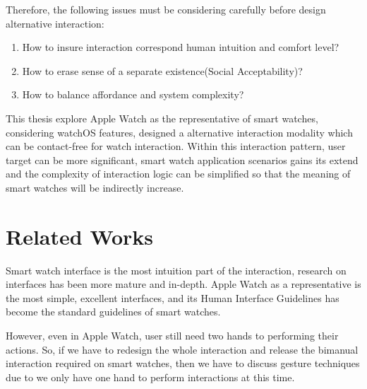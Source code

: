 Therefore, the following issues must be considering carefully before design alternative interaction:

\begin{enumerate}
    \kaishu
    \item How to insure interaction correspond human intuition and comfort level?
    \item How to erase sense of a separate existence(Social Acceptability)?
    \item How to balance affordance and system complexity?
\end{enumerate}

This thesis explore Apple Watch as the representative of smart watches, considering watchOS features, designed a alternative interaction modality which can be contact-free for watch interaction. Within this interaction pattern, user target can be more significant, smart watch application scenarios gains its extend and the complexity of interaction logic can be simplified so that the meaning of smart watches will be indirectly increase.

\section{Related Works}

Smart watch interface is the most intuition part of the interaction\cite{liuheng2015}, research on interfaces has been more mature and in-depth\cite{chengshiwei2009,fuaiming2006}. Apple Watch as a representative is the most simple, excellent interfaces, and its Human Interface Guidelines\cite{WatchGuidelines:2016} has become the standard guidelines of smart watches.

However, even in Apple Watch, user still need two hands to performing their actions. So, if we have to redesign the whole interaction and release the bimanual interaction required on smart watches, then we have to discuss gesture techniques due to we only have one hand to perform interactions at this time.

